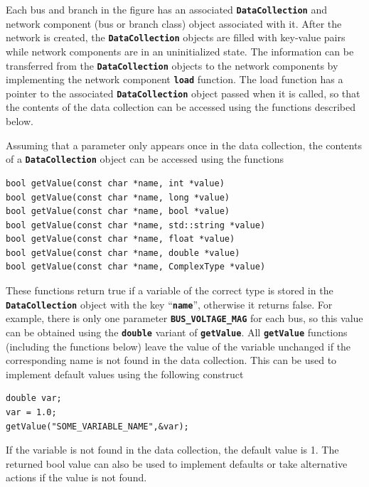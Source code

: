 \documentclass[12pt]{report} %
\begin{document}
Each bus and branch in the figure has an associated \texttt{\textbf{DataCollection}} and network component (bus or branch class) object associated with it. After the network is created, the \texttt{\textbf{DataCollection}} objects are filled with key-value pairs while network components are in an uninitialized state. The information can be transferred from the \texttt{\textbf{DataCollection}} objects to the network components by implementing the network component \texttt{\textbf{load}} function. The load function has a pointer to the associated \texttt{\textbf{DataCollection}} object passed when it is called, so that the contents of the data collection can be accessed using the functions described below.

Assuming that a parameter only appears once in the data collection, the contents of a \texttt{\textbf{DataCollection}} object can be accessed using the functions

{
\color{red}
\begin{Verbatim}[fontseries=b]
bool getValue(const char *name, int *value)
bool getValue(const char *name, long *value)
bool getValue(const char *name, bool *value)
bool getValue(const char *name, std::string *value)
bool getValue(const char *name, float *value)
bool getValue(const char *name, double *value)
bool getValue(const char *name, ComplexType *value)
\end{Verbatim}
}

These functions return true if a variable of the correct type is stored in the \texttt{\textbf{DataCollection}} object with the key ``\texttt{\textbf{name}}'', otherwise it returns false. For example, there is only one parameter \texttt{\textbf{BUS\_VOLTAGE\_MAG}} for each bus, so this value can be obtained using the \texttt{\textbf{double}} variant of \texttt{\textbf{getValue}}.
All \texttt{\textbf{getValue}} functions (including the functions below) leave the value of the variable unchanged if the corresponding name is not found in the data collection. This can be used to implement default values using the following construct

{
\color{red}
\begin{Verbatim}[fontseries=b]
double var;
var = 1.0;
getValue("SOME_VARIABLE_NAME",&var);
\end{Verbatim}
}

If the variable is not found in the data collection, the default value is 1. The returned bool value can also be used to implement defaults or take alternative actions if the value is not found.
\end{document}
